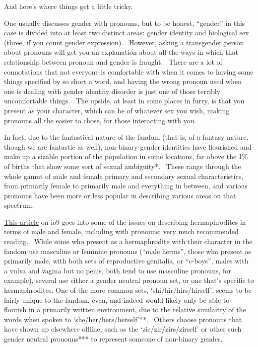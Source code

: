 And here's where things get a little tricky.

One usually discusses gender with pronouns, but to be honest, ``gender''
in this case is divided into at least two distinct areas: gender
identity and biological sex (three, if you count gender expression).
~However, asking a transgender person about pronouns will get you an
explanation about all the ways in which that relationship between
pronoun and gender is fraught. ~There are a lot of connotations that not
everyone is comfortable with when it comes to having some things
specified by so short a word, and having the wrong pronoun used when one
is dealing with gender identity disorder is just one of those terribly
uncomfortable things. ~The upside, at least in some places in furry, is
that you present as your character, which can be of whatever sex you
wish, making pronouns all the easier to chose, for those interacting
with you.

In fact, due to the fantastical nature of the fandom (that is, of a
fantasy nature, though we are fantastic as well), non-binary gender
identities have flourished and make up a sizable portion of the
population in some locations, far above the 1\% of births that show some
sort of sexual ambiguity*. ~These range through the whole gamut of male
and female primary and secondary sexual characteristics, from primarily
female to primarily male and everything in between, and various pronouns
have been more or less popular in describing various areas on that
spectrum.

\href{http://io9.com/5939725/how-to-write-about-hermaphrodite-sex}{This
article} on io9 goes into some of the issues on describing
hermaphrodites in terms of male and female, including with pronouns;
very much recommended reading. ~While some who present as a
hermaphrodite with their character in the fandom use masculine or
feminine pronouns (``male herms'', those who present as primarily male,
with both sets of reproductive genitalia, or ``c-boys'', males with a
vulva and vagina but no penis, both tend to use masculine pronouns, for
example), several use either a gender neutral pronoun set, or one that's
specific to hermaphrodites. One of the more common sets,
`shi/hir/hirs/hirself', seems to be fairly unique to the fandom, even,
and indeed would likely only be able to flourish in a primarily written
environment, due to the relative similarity of the words when spoken to
`she/her/hers/herself'**. ~Others choose pronouns that have shown up
elsewhere offline, such as the `zie/zir/zirs/zirself' or other such
gender neutral pronouns*** to represent someone of non-binary gender.

